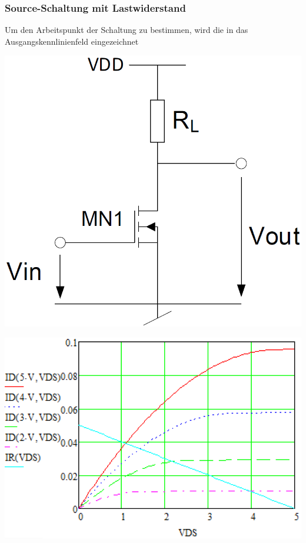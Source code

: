 \subsubsection{Source-Schaltung mit Lastwiderstand}
    Um den Arbeitspunkt der Schaltung zu bestimmen, wird die  in das
    Ausgangskennlinienfeld eingezeichnet

    \begin{minipage}[c]{0.4\columnwidth}
        \includegraphics[width=0.9\columnwidth]{images/source_schaltung.png}
    \end{minipage}
    \hfill
    \begin{minipage}[c]{0.5\columnwidth}
        \includegraphics[width=\columnwidth]{images/source_schaltung_lastgerade.png}
    \end{minipage}



